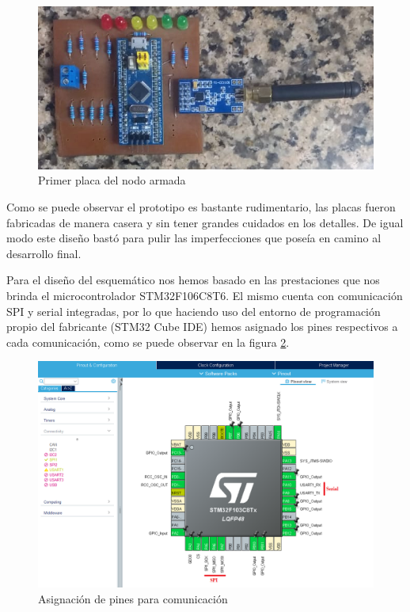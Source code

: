 \begin{figure}
	\centering
	\includegraphics[scale=0.53]{images/nodos/prototipo_nodo.png}
    \caption{Primer placa del nodo armada}
	\label{prototipo_nodo}
\end{figure}

Como se puede observar el prototipo es bastante rudimentario, las placas fueron fabricadas de manera casera y sin tener grandes
cuidados en los detalles. De igual modo este diseño bastó para pulir las imperfecciones que poseía en camino al desarrollo final.\par 
Para el diseño del esquemático nos hemos basado en las prestaciones que nos brinda el microcontrolador STM32F106C8T6. El mismo
cuenta con comunicación SPI y serial integradas, por lo que haciendo uso del entorno de programación propio del fabricante 
(STM32 Cube IDE) hemos asignado los pines respectivos a cada comunicación, como se puede observar en la figura \ref{asignacion_pines}. \par

\begin{figure}
	\centering
	\includegraphics[scale=0.43]{images/nodos/asignacion_pines.png}
    \caption{Asignación de pines para comunicación}
	\label{asignacion_pines}
\end{figure}

